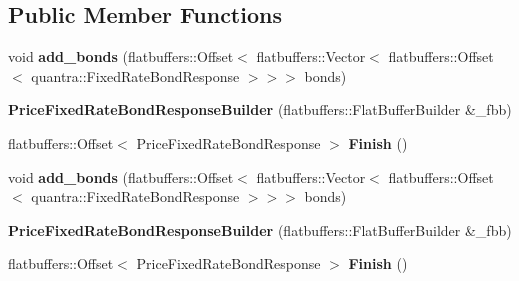 \subsection*{Public Member Functions}
\begin{DoxyCompactItemize}
\item 
\mbox{\label{structquantra_1_1PriceFixedRateBondResponseBuilder_ac20ad06937b4ddf7c93f9067fd1e7328}} 
void {\bfseries add\+\_\+bonds} (flatbuffers\+::\+Offset$<$ flatbuffers\+::\+Vector$<$ flatbuffers\+::\+Offset$<$ quantra\+::\+Fixed\+Rate\+Bond\+Response $>$$>$$>$ bonds)
\item 
\mbox{\label{structquantra_1_1PriceFixedRateBondResponseBuilder_a880757fff5dd2b5b6dce35235a5a254b}} 
{\bfseries Price\+Fixed\+Rate\+Bond\+Response\+Builder} (flatbuffers\+::\+Flat\+Buffer\+Builder \&\+\_\+fbb)
\item 
\mbox{\label{structquantra_1_1PriceFixedRateBondResponseBuilder_a2f8966503cd2869044470fb17d9aa561}} 
flatbuffers\+::\+Offset$<$ Price\+Fixed\+Rate\+Bond\+Response $>$ {\bfseries Finish} ()
\item 
\mbox{\label{structquantra_1_1PriceFixedRateBondResponseBuilder_ac20ad06937b4ddf7c93f9067fd1e7328}} 
void {\bfseries add\+\_\+bonds} (flatbuffers\+::\+Offset$<$ flatbuffers\+::\+Vector$<$ flatbuffers\+::\+Offset$<$ quantra\+::\+Fixed\+Rate\+Bond\+Response $>$$>$$>$ bonds)
\item 
\mbox{\label{structquantra_1_1PriceFixedRateBondResponseBuilder_a880757fff5dd2b5b6dce35235a5a254b}} 
{\bfseries Price\+Fixed\+Rate\+Bond\+Response\+Builder} (flatbuffers\+::\+Flat\+Buffer\+Builder \&\+\_\+fbb)
\item 
\mbox{\label{structquantra_1_1PriceFixedRateBondResponseBuilder_a2f8966503cd2869044470fb17d9aa561}} 
flatbuffers\+::\+Offset$<$ Price\+Fixed\+Rate\+Bond\+Response $>$ {\bfseries Finish} ()
\item 
\mbox{\label{structquantra_1_1PriceFixedRateBondResponseBuilder_ac20ad06937b4ddf7c93f9067fd1e7328}} 

\end{DoxyCompactItemize}
